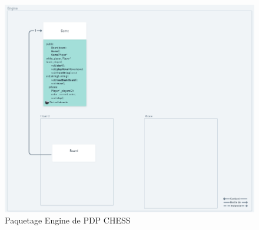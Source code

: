 \documentclass{article}
\begin{document}
\begin{figure}[!h]
    \centering
    \includegraphics[scale = 0.3]{img/Package/Engine.png}
    \caption{Paquetage Engine de PDP CHESS}
    \label{pck:engine}
\end{figure}

\newpage
\end{document}
